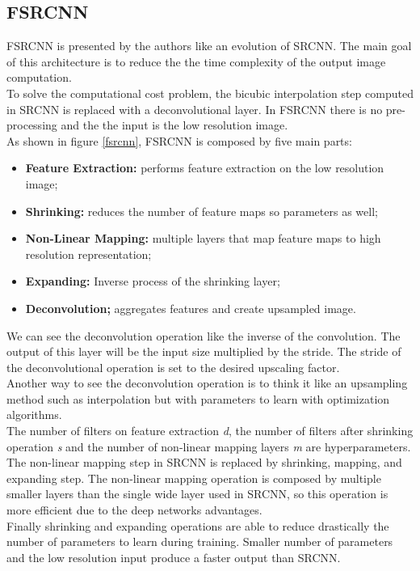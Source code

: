 \documentclass[10pt,twocolumn,letterpaper]{article}
\begin{document}
\subsection{FSRCNN}
FSRCNN is presented by the authors like an evolution of SRCNN. The main goal of this architecture is to reduce the the time complexity of the output image computation.\\
To solve the computational cost problem, the bicubic interpolation step computed in SRCNN is replaced with a deconvolutional layer. In FSRCNN there is no pre-processing and the the input is the low resolution image.\\
As shown in figure \ref{fsrcnn}, FSRCNN is composed by five main parts:
\begin{itemize}
	\item \textbf{Feature Extraction:} performs feature extraction on the low resolution image;
	\item \textbf{Shrinking:} reduces the number of feature maps so parameters as well;
	 \item \textbf{Non-Linear Mapping:} multiple layers that map feature maps to high resolution  representation;
	\item \textbf{Expanding:} Inverse process of the shrinking layer;
	\item \textbf{Deconvolution;} aggregates features and create upsampled image.
\end{itemize}
We can see the deconvolution operation like the inverse of the convolution. The output of this layer will be the input size multiplied by the stride.  The stride of the deconvolutional operation is set to the desired upscaling factor.\\
Another way to see the deconvolution operation is to think it like an upsampling method such as interpolation but with parameters to learn with optimization algorithms.\\
The number of filters on feature extraction \textit{d}, the number of filters after shrinking operation \textit{s} and the number of non-linear mapping layers \textit{m} are hyperparameters.\\
The non-linear mapping step in SRCNN is replaced by shrinking, mapping, and expanding step.
The non-linear mapping operation is composed by multiple smaller layers than the single wide layer used in SRCNN, so this operation is more efficient due to the deep networks advantages.\\
Finally shrinking and expanding operations are able to reduce drastically the number of parameters to learn during training. Smaller number of parameters and the low resolution input produce a faster output than SRCNN.\\
\end{document}
